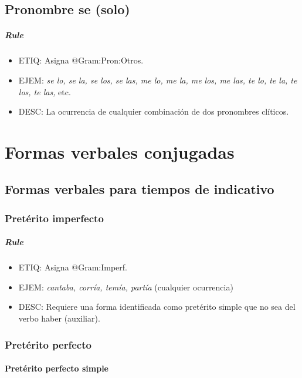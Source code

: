 \documentclass[11pt]{report}
\begin{document}
\section{Pronombre se (solo)}
\paragraph*{Rule}
\begin{itemize}
\item ETIQ: Asigna @Gram:Pron:Otros.
\item EJEM: \emph{se lo, se la, se los, se las, me lo, me la, me los, me las, te lo, te la, te los, te las,} etc.
\item DESC: La ocurrencia de cualquier combinación de dos pronombres clíticos.
\end{itemize}

\chapter{Formas verbales conjugadas}
\section{Formas verbales para tiempos de indicativo}
\subsection{Pretérito imperfecto}
\paragraph*{Rule}
\begin{itemize}
\item ETIQ: Asigna @Gram:Imperf.
\item EJEM: \emph{cantaba, corría, temía, partía} (cualquier ocurrencia)
\item DESC: Requiere una forma identificada como pretérito simple que no sea del verbo haber (auxiliar).
\end{itemize}

\subsection{Pretérito perfecto}
\subsubsection{Pretérito perfecto simple}
\end{document}
